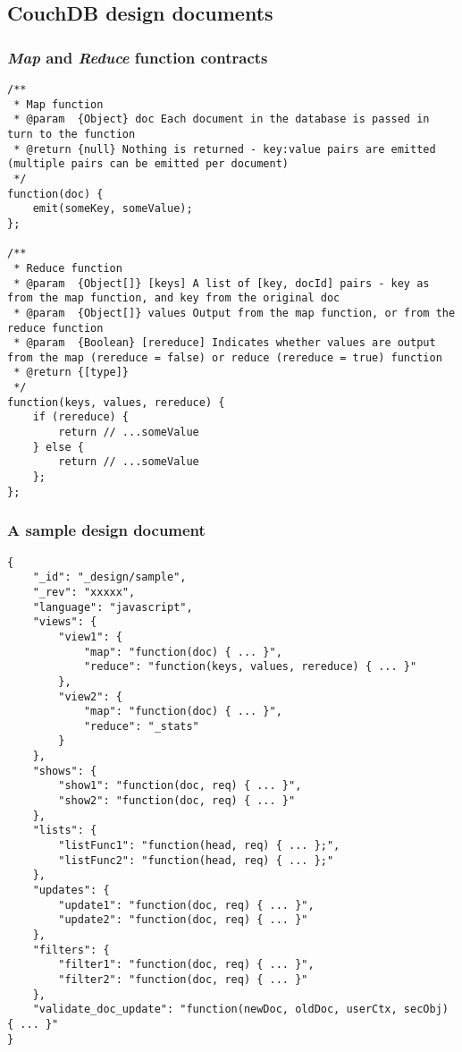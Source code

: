 \subsection{CouchDB design documents}
\label{appendix:designDoc}

\subsubsection{\textit{Map} and \textit{Reduce} function contracts}
\begin{verbatim}
/**
 * Map function
 * @param  {Object} doc Each document in the database is passed in turn to the function
 * @return {null} Nothing is returned - key:value pairs are emitted (multiple pairs can be emitted per document)
 */
function(doc) {
    emit(someKey, someValue);
};

/**
 * Reduce function
 * @param  {Object[]} [keys] A list of [key, docId] pairs - key as from the map function, and key from the original doc
 * @param  {Object[]} values Output from the map function, or from the reduce function
 * @param  {Boolean} [rereduce] Indicates whether values are output from the map (rereduce = false) or reduce (rereduce = true) function
 * @return {[type]}
 */
function(keys, values, rereduce) {
    if (rereduce) {
        return // ...someValue
    } else {
        return // ...someValue    
    };
};
\end{verbatim}

\subsubsection{A sample design document}
\begin{verbatim}
{
    "_id": "_design/sample",
    "_rev": "xxxxx",
    "language": "javascript",
    "views": {
        "view1": {
            "map": "function(doc) { ... }",
            "reduce": "function(keys, values, rereduce) { ... }"
        },
        "view2": {
            "map": "function(doc) { ... }",
            "reduce": "_stats"            
        }
    },
    "shows": {
        "show1": "function(doc, req) { ... }",
        "show2": "function(doc, req) { ... }"
    },
    "lists": {
        "listFunc1": "function(head, req) { ... };",
        "listFunc2": "function(head, req) { ... };"
    },
    "updates": {
        "update1": "function(doc, req) { ... }",
        "update2": "function(doc, req) { ... }"
    },
    "filters": {
        "filter1": "function(doc, req) { ... }",
        "filter2": "function(doc, req) { ... }"
    },
    "validate_doc_update": "function(newDoc, oldDoc, userCtx, secObj) { ... }"
}

\end{verbatim}